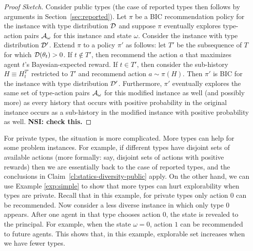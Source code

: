 
\begin{proof}[Proof Sketch]
Consider public types (the case of reported types then follows by arguments in Section~\ref{sec:reported}).  Let $\pi$ be a BIC recommendation policy for the instance with type distribution $\mathcal{D}$ and suppose $\pi$ eventually explores type-action pairs $\mathcal{A}_{\omega}$ for this instance and state $\omega$.  Consider the instance with type distribution $\mathcal{D}'$.  Extend $\pi$ to a policy $\pi'$ as follows: let $T'$ be the subsequence of $T$ for which $\mathcal{D}(\theta_t)>0$. If $t\not\in T'$, then recommend the action $a$ that maximizes agent $t$'s Bayesian-expected reward.  If $t\in T'$, then consider the sub-history $H\equiv H^{T'}_t$ restricted to $T'$ and recommend action $a\sim\pi(H)$.  Then $\pi'$ is BIC for the instance with type distribution $\mathcal{D}'$. Furthermore, $\pi'$ eventually explores the same set of type-action pairs $\mathcal{A}_{\omega}$ for this modified instance as well (and possibly more) as every history that occurs with positive probability in the original instance occurs as a sub-history in the modified instance with positive probability as well.
{\bf NSI: check this.}
\end{proof}

For private types, the situation is more complicated. More types can help for some problem instances. For example, if different types have disjoint sets of available actions (more formally: say, disjoint sets of actions with positive rewards) then we are essentially back to the case of reported types, and the conclusions in Claim~\ref{cl:statics-diversity-public} apply. On the other hand, we can use Example \ref{exp:simple} to show that more types can hurt explorability when types are private. Recall that in this example, for private types only action 0 can be recommended. Now consider a less diverse instance in which only type 0 appears. After one agent in that type chooses action 0, the state is revealed to the principal. For example, when the state $\omega = 0$, action $1$ can be recommended to future agents. This shows that,  in this example, explorable set increases when we have fewer types.
